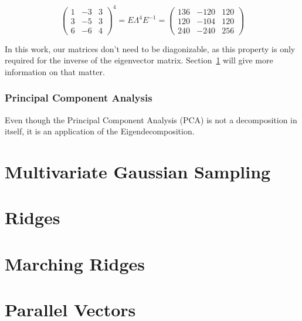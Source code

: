 \begin{equation}
  \begin{pmatrix}
    1 & {-3} & 3\\
    3 & {-5} & 3\\
    6 & {-6} & 4
  \end{pmatrix}
  ^4
  =
  E
  \Lambda^4
  E^{-1}
  =
  \begin{pmatrix}
    136 & {-120} & 120\\
    120 & {-104} & 120\\
    240 & {-240} & 256
  \end{pmatrix}
\end{equation}

In this work, our matrices don't need to be diagonizable, as this
property is only required for the inverse of the eigenvector matrix.
Section~\ref{sec:MGS} will give more information on that matter. 

\subsubsection{Principal Component Analysis}

Even though the Principal Component Analysis (PCA) is not a decomposition
in itself, it is an application of the Eigendecomposition.

\section{Multivariate Gaussian Sampling}\label{sec:MGS}

\section{Ridges}

\section{Marching Ridges}

\section{Parallel Vectors}
